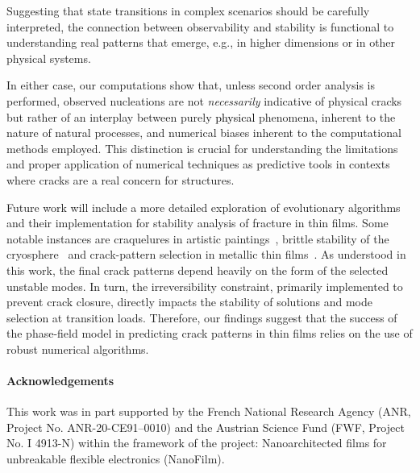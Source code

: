\documentclass[10pt]{article}
\begin{document}
Suggesting that state transitions in complex scenarios should be carefully interpreted, the connection between observability and stability is functional to understanding real patterns that emerge, e.g., in higher dimensions or in other physical systems.

In either case, our computations show that, unless second order analysis is performed, observed nucleations are not \emph{necessarily} indicative of physical cracks but rather of an interplay between purely   \textcolor{black}{physical} phenomena, inherent to the nature of natural processes, and numerical biases inherent to the computational methods employed. This distinction is crucial for understanding the limitations and proper application of numerical techniques as predictive tools in contexts where cracks are a real concern for structures.


Future work will include a more detailed exploration of evolutionary algorithms and their implementation for stability analysis of fracture in thin films. Some notable instances are craquelures in artistic paintings~\cite{fuster-lopez:2020-picassos, Bosco:2020aa,Bosco:2021},  brittle stability of the cryosphere~\cite{weiss:2017-linking, tollefson:2017-giant, Sun:2023aa, Millan:2023aa} and crack-pattern selection in metallic thin films~\cite{Faurie2019-to}. {As understood in this work, the final crack patterns depend heavily on the form of the selected unstable modes. In turn, the irreversibility constraint, primarily implemented to prevent crack closure, directly impacts the stability of solutions and mode selection at transition loads. Therefore, our findings suggest that the success of the phase-field model in predicting crack patterns in thin films relies on the use of robust numerical algorithms.}


\paragraph{Acknowledgements} This work was in part supported by the French National Research Agency (ANR, Project No. ANR-20-CE91–0010) and the Austrian Science Fund (FWF, Project No. I 4913-N) within the framework of the project: Nanoarchitected films for unbreakable flexible electronics (NanoFilm).
%



%
\end{document}

